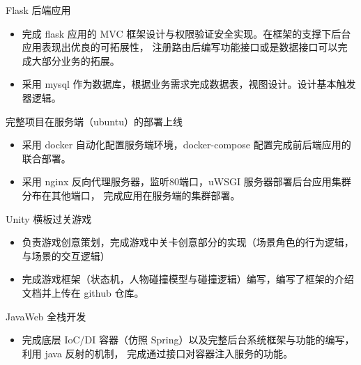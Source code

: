 \documentclass{resume}
\begin{document}
  \begin{onehalfspacing}
  Flask 后端应用
    \begin{itemize}
      \item 完成 flask 应用的 MVC 框架设计与权限验证安全实现。在框架的支撑下后台应用表现出优良的可拓展性，
      注册路由后编写功能接口或是数据接口可以完成大部分业务的拓展。
      \item 采用 mysql 作为数据库，根据业务需求完成数据表，视图设计。设计基本触发器逻辑。
    \end{itemize}
  完整项目在服务端（ubuntu）的部署上线
    \begin{itemize}
      \item 采用 docker 自动化配置服务端环境，docker-compose 配置完成前后端应用的联合部署。
      \item 采用 nginx 反向代理服务器，监听80端口，uWSGI 服务器部署后台应用集群分布在其他端口，
      完成应用在服务端的集群部署。
    \end{itemize}
  
  \end{onehalfspacing}

  \begin{onehalfspacing}
  Unity 横板过关游戏
    \begin{itemize}
      \item 负责游戏创意策划，完成游戏中关卡创意部分的实现（场景角色的行为逻辑，与场景的交互逻辑）
      \item 完成游戏框架（状态机，人物碰撞模型与碰撞逻辑）编写，编写了框架的介绍文档并上传在 github 仓库。
    \end{itemize}
  \end{onehalfspacing}

  \begin{onehalfspacing}
  JavaWeb 全栈开发
  \begin{itemize}
    \item 完成底层 IoC/DI 容器（仿照 Spring）以及完整后台系统框架与功能的编写，利用 java 反射的机制，
    完成通过接口对容器注入服务的功能。    
  \end{itemize}
  \end{onehalfspacing}
\end{document}
